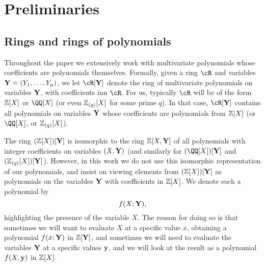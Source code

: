 \documentclass[11pt,letterpaper,usenames,dvipsnames]{article}
\title{\stylizedtitle}
\author{
	Albert Garreta, Psi Vesely, Arantxa Zapico
}
\date{\today}
\begin{document}
\maketitle

\begin{abstract}
\end{abstract}

\setcounter{tocdepth}{2}
\begin{spacing}{0.8}
{\footnotesize \tableofcontents}
\end{spacing}
\section{Preliminaries}


\subsection{Rings and rings of polynomials} Throughout the paper we extensively work with multivariate polynomials whose coefficients are polynomials themselves. Formally, given a ring $\cR$ and variables $\mathbf{Y}=(Y_1,\ldots, Y_\mu)$, we let $\cR[\YY]$ denote the ring of multivariate polynomials on variables $\mathbf{Y}$, with coefficients inn $\cR$. For us, typically $\cR$ will be of the form $\mathbb{Z}[X]$ or $\QQ[X]$ (or even $\mathbb{Z}_{(q)}[X]$ for some prime $q$). In that case, $\cR[\YY]$ contains all polynomials on variables $\mathbf{Y}$ whose coefficients are polynomials from $\mathbb{Z}[X]$ (or $\QQ[X]$, or $\mathbb{Z}_{(q)}[X]$). 

The ring $(\mathbb{Z}[X])[\mathbf{Y}]$ is isomorphic to the ring $\mathbb{Z}[X, \mathbf{Y}]$ of all polynomials with integer coefficients on variables $(X,\mathbf{Y})$  (and similarly for $(\QQ[X])[\YY]$ and $(\mathbb{Z}_{(q)}[X])[\mathbf{Y}]$). However, in this work we do not use this isomorphic representation of our polynomials, and insist on viewing elements from $(\mathbb{Z}[X])[\mathbf{Y}]$ as polynomials on the variables $\mathbf{Y}$ with coefficients in $\mathbb{Z}[X]$. We denote such a polynomial by $$f(X;\mathbf{Y}),$$
highlighting the presence of the variable $X$. The reason for doing so is that sometimes we will want to evaluate $X$ at a specific value $x$, obtaining a polynomial $f(x;\mathbf{Y})$ in $\mathbb{Z}[\mathbf{Y}]$, and sometimes we will need to evaluate the variables $\mathbf{Y}$ at a specific values $\mathbf{y}$, and we will look at the result as  a polynomial $f(X,\mathbf{y})$ in $\mathbb{Z}[X]$. 
\end{document}
